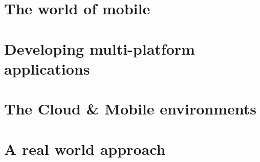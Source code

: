 \part{The world of mobile}


\cleardoublepage
{}
\part{Developing multi-platform applications}



\part{The Cloud \& Mobile environments}






\part{A real world approach}




\appendix
\cleardoublepage

\cleardoublepage
\cleardoublepage


